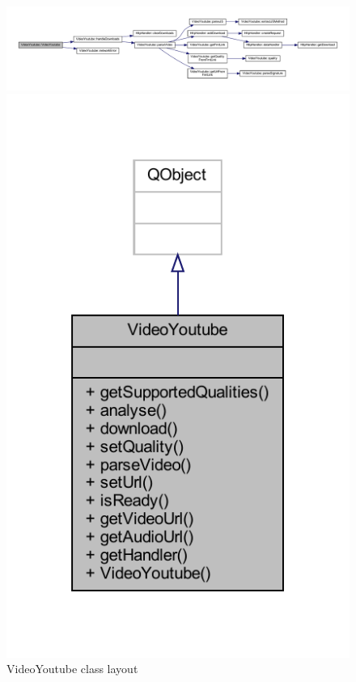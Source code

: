 \documentclass{article}
\begin{document}
\begin{figure}
    \begin{sideways}
        \centering
        \includegraphics[width=\textheight]{classPdfs/classVideoYoutube_a80afcc31ca007b32108976d2158be9ce_cgraph.pdf} 
    \end{sideways}
    \includegraphics[]{classPdfs/classVideoYoutube.pdf}
    \caption{VideoYoutube class layout} \label{fig:VideoYoutube class layout}
\end{figure}
\end{document}
